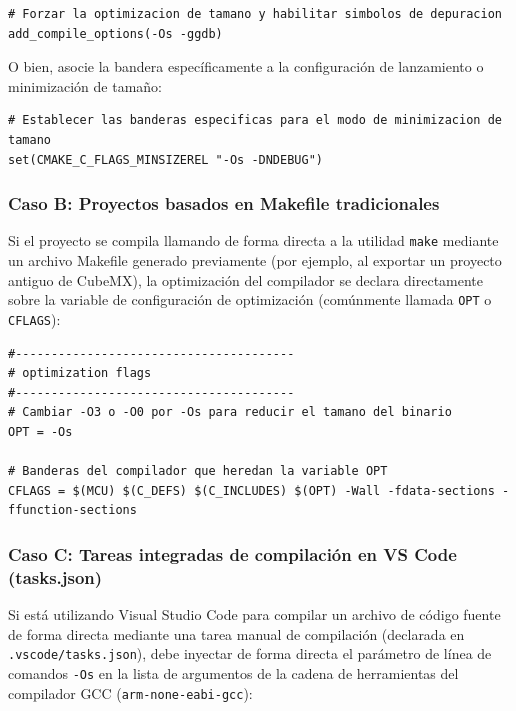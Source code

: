 \documentclass[
10pt, %
a4paper, %
oneside, %
headinclude,footinclude, %
BCOR5mm, %
]{scrartcl}
\begin{document}
\begin{lstlisting}[style=CMakeStyle]
# Forzar la optimizacion de tamano y habilitar simbolos de depuracion
add_compile_options(-Os -ggdb)
\end{lstlisting}

O bien, asocie la bandera específicamente a la configuración de lanzamiento o minimización de tamaño:
\begin{lstlisting}[style=CMakeStyle]
# Establecer las banderas especificas para el modo de minimizacion de tamano
set(CMAKE_C_FLAGS_MINSIZEREL "-Os -DNDEBUG")
\end{lstlisting}

\subsubsection{Caso B: Proyectos basados en Makefile tradicionales}
Si el proyecto se compila llamando de forma directa a la utilidad \texttt{make} mediante un archivo Makefile generado previamente (por ejemplo, al exportar un proyecto antiguo de CubeMX), la optimización del compilador se declara directamente sobre la variable de configuración de optimización (comúnmente llamada \texttt{OPT} o \texttt{CFLAGS}):

\begin{lstlisting}[style=CMakeStyle, caption={Configuracion de optimizacion de tamano en un Makefile.}]
#---------------------------------------
# optimization flags
#---------------------------------------
# Cambiar -O3 o -O0 por -Os para reducir el tamano del binario
OPT = -Os

# Banderas del compilador que heredan la variable OPT
CFLAGS = $(MCU) $(C_DEFS) $(C_INCLUDES) $(OPT) -Wall -fdata-sections -ffunction-sections
\end{lstlisting}

\subsubsection{Caso C: Tareas integradas de compilación en VS Code (tasks.json)}
Si está utilizando Visual Studio Code para compilar un archivo de código fuente de forma directa mediante una tarea manual de compilación (declarada en \texttt{.vscode/tasks.json}), debe inyectar de forma directa el parámetro de línea de comandos \texttt{-Os} en la lista de argumentos de la cadena de herramientas del compilador GCC (\texttt{arm-none-eabi-gcc}):
\end{document}

